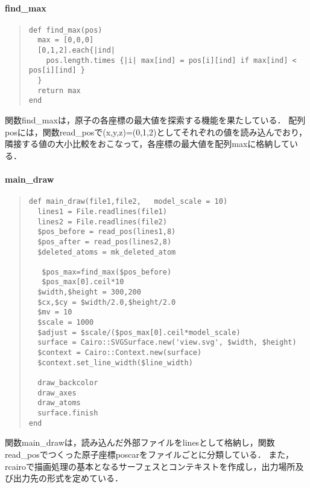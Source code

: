 \paragraph{find\_max}\begin{quote}\begin{verbatim}
def find_max(pos)
  max = [0,0,0]
  [0,1,2].each{|ind|
    pos.length.times {|i| max[ind] = pos[i][ind] if max[ind] < pos[i][ind] }
  }
  return max
end
\end{verbatim}\end{quote}
関数find\_maxは，原子の各座標の最大値を探索する機能を果たしている．
配列posには，関数read\_posで(x,y,z)=(0,1,2)としてそれぞれの値を読み込んでおり，隣接する値の大小比較をおこなって，各座標の最大値を配列maxに格納している．

\paragraph{main\_draw}\begin{quote}\begin{verbatim}
def main_draw(file1,file2,   model_scale = 10)
  lines1 = File.readlines(file1)
  lines2 = File.readlines(file2)
  $pos_before = read_pos(lines1,8)
  $pos_after = read_pos(lines2,8)
  $deleted_atoms = mk_deleted_atom

   $pos_max=find_max($pos_before)
   $pos_max[0].ceil*10
  $width,$height = 300,200
  $cx,$cy = $width/2.0,$height/2.0
  $mv = 10
  $scale = 1000
  $adjust = $scale/($pos_max[0].ceil*model_scale)
  surface = Cairo::SVGSurface.new('view.svg', $width, $height)
  $context = Cairo::Context.new(surface)
  $context.set_line_width($line_width)

  draw_backcolor
  draw_axes
  draw_atoms
  surface.finish
end
\end{verbatim}\end{quote}
関数main\_drawは，読み込んだ外部ファイルをlinesとして格納し，関数read\_posでつくった原子座標poscarをファイルごとに分類している．
また，rcairoで描画処理の基本となるサーフェスとコンテキストを作成し，出力場所及び出力先の形式を定めている．

